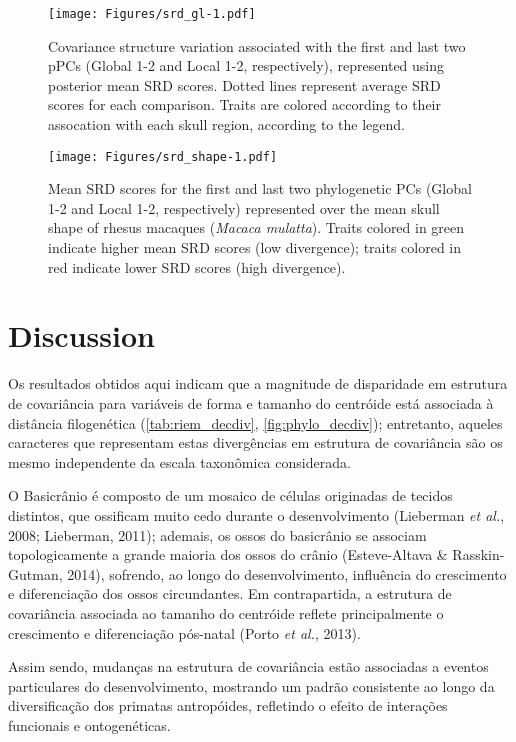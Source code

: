 \documentclass[12pt,twoside]{report}
\begin{document}
\begin{figure}[htbp]
\centering
\texttt{[image: Figures/srd\_gl-1.pdf]}
\caption{Covariance structure variation associated with the first and
last two pPCs (Global 1-2 and Local 1-2, respectively), represented
using posterior mean SRD scores. Dotted lines represent average SRD
scores for each comparison. Traits are colored according to their
assocation with each skull region, according to the legend.
\label{fig:srd_gl}}
\end{figure}

\begin{figure}[htbp]
\centering
\texttt{[image: Figures/srd\_shape-1.pdf]}
\caption{Mean SRD scores for the first and last two phylogenetic PCs
(Global 1-2 and Local 1-2, respectively) represented over the mean skull
shape of rhesus macaques (\emph{Macaca mulatta}). Traits colored in
green indicate higher mean SRD scores (low divergence); traits colored
in red indicate lower SRD scores (high divergence).
\label{fig:srd_shape}}
\end{figure}

\section{Discussion}\label{discussion-2}

Os resultados obtidos aqui indicam que a magnitude de disparidade em
estrutura de covariância para variáveis de forma e tamanho do centróide
está associada à distância filogenética (\autoref{tab:riem_decdiv},
\autoref{fig:phylo_decdiv}); entretanto, aqueles caracteres que
representam estas divergências em estrutura de covariância são os mesmo
independente da escala taxonômica considerada.

O Basicrânio é composto de um mosaico de células originadas de tecidos
distintos, que ossificam muito cedo durante o desenvolvimento (Lieberman
\emph{et al.}, 2008; Lieberman, 2011); ademais, os ossos do basicrânio
se associam topologicamente a grande maioria dos ossos do crânio
(Esteve-Altava \& Rasskin-Gutman, 2014), sofrendo, ao longo do
desenvolvimento, influência do crescimento e diferenciação dos ossos
circundantes. Em contrapartida, a estrutura de covariância associada ao
tamanho do centróide reflete principalmente o crescimento e
diferenciação pós-natal (Porto \emph{et al.}, 2013).

Assim sendo, mudanças na estrutura de covariância estão associadas a
eventos particulares do desenvolvimento, mostrando um padrão consistente
ao longo da diversificação dos primatas antropóides, refletindo o efeito
de interações funcionais e ontogenéticas.
\end{document}
